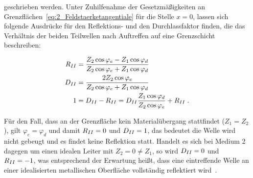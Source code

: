 geschrieben werden. Unter Zuhilfenahme der Gesetzmäßigkeiten an Grenzflächen~\eqref{eq:2_Feldstaerketangentiale} für die Stelle $x=0$, lassen sich folgende Ausdrücke für den Reflektions- und den Durchlassfaktor finden, die das Verhältnis der beiden Teilwellen nach Auftreffen auf eine Grenzschicht beschreiben:

\begin{align}
    R_{\uproman{2}} &= \frac{Z_2 \cos{\varphi_e} - Z_1 \cos{\varphi_d}}{Z_2 \cos{\varphi_e} + Z_1 \cos{\varphi_d}} \\
    D_{\uproman{2}} &= \frac{2 Z_2 \cos{\varphi_e}}{Z_2 \cos{\varphi_e} + Z_1 \cos{\varphi_d}} \\ 
    1 &= D_{\uproman{2}} - R_{\uproman{2}} = D_{\uproman{2}} \frac{Z_1 \cos{\varphi_d}}{Z_2 \cos{\varphi_e}} + R_{\uproman{2}} \; .
\end{align}

Für den Fall, dass an der Grenzfläche kein Materialübergang stattfindet ($Z_1 = Z_2$), gilt $\varphi_e = \varphi_d$ und damit $R_{\uproman{2}} = 0$ und $D_{\uproman{2}} = 1$, das bedeutet die Welle wird nicht gebeugt und es findet keine Reflektion statt. Handelt es sich bei Medium 2 dagegen um einen idealen Leiter mit $Z_2 = 0 \neq Z_1$, so wird $D_{\uproman{2}} = 0$ und $R_{\uproman{2}} = -1$, was entsprechend der Erwartung heißt, dass eine eintreffende Welle an einer idealisierten metallischen Oberfläche vollständig reflektiert wird~\cite{EM_Schirmung}. 






